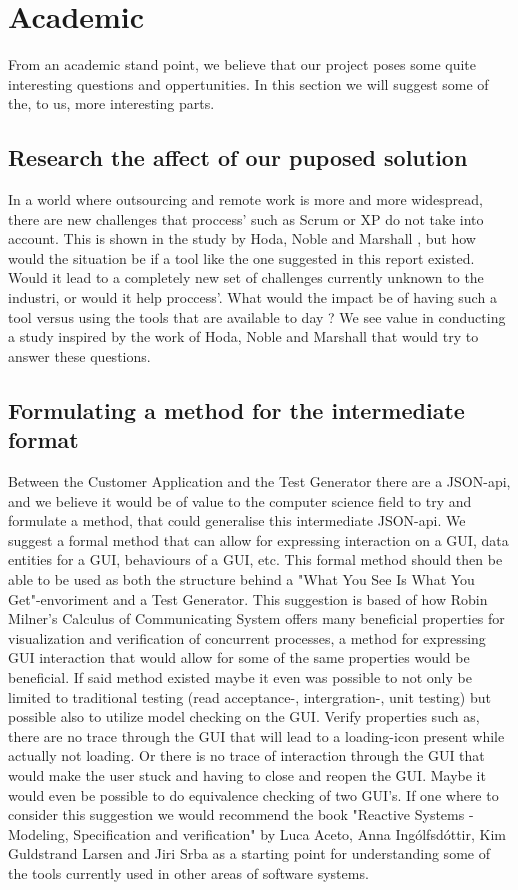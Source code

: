 \section{Academic}

From an academic stand point, we believe that our project poses some quite interesting questions and oppertunities.
In this section we will suggest some of the, to us, more interesting parts.

\subsection{Research the affect of our puposed solution}
In a world where outsourcing and remote work is more and more widespread, there are new challenges that proccess' such as Scrum or XP do not take into account.
This is shown in the study by Hoda, Noble and Marshall \cite{Hoda2011TheIO}, but how would the situation be if a tool like the one suggested in this report existed.
Would it lead to a completely new set of challenges currently unknown to the industri, or would it help proccess'.
What would the impact be of having such a tool versus using the tools that are available to day ?
We see value in conducting a study inspired by the work of Hoda, Noble and Marshall that would try to answer these questions.

\subsection{Formulating a method for the intermediate format}
Between the Customer Application and the Test Generator there are a JSON-api, and we believe it would be of value to the computer science field to try and formulate a method, that could generalise this intermediate JSON-api.
We suggest a formal method that can allow for expressing interaction on a GUI, data entities for a GUI, behaviours of a GUI, etc.
This formal method should then be able to be used as both the structure behind a "What You See Is What You Get"-envoriment and a Test Generator.
This suggestion is based of how Robin Milner's Calculus of Communicating System offers many beneficial properties for visualization and verification of concurrent processes, a method for expressing GUI interaction that would allow for some of the same properties would be beneficial.
If said method existed maybe it even was possible to not only be limited to traditional testing (read acceptance-, intergration-, unit testing) but possible also to utilize model checking on the GUI.
Verify properties such as, there are no trace through the GUI that will lead to a loading-icon present while actually not loading.
Or there is no trace of interaction through the GUI that would make the user stuck and having to close and reopen the GUI.
Maybe it would even be possible to do equivalence checking of two GUI's.
If one where to consider this suggestion we would recommend the book "Reactive Systems - Modeling, Specification and verification" by Luca Aceto, Anna Ingólfsdóttir, Kim Guldstrand Larsen and Jiri Srba as a starting point for understanding some of the tools currently used in other areas of software systems.

